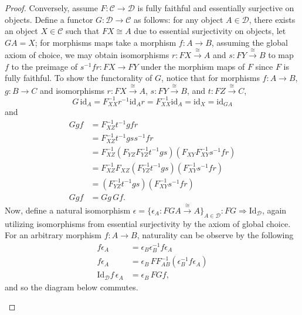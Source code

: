 \documentclass[ 12pt ]{article}
\begin{document}
\begin{enumerate}
\begin{enumerate}
\begin{proof}
				Conversely, assume $F : \mathscr{C} \to \mathscr{D}$ is fully faithful and essentially surjective on objects. Define a functor $G : \mathscr{D} \to \mathscr{C}$ as follows: for any object $A \in \mathscr{D}$, there exists an object $X \in \mathscr{C}$ such that $FX \cong A$ due to essential surjectivity on objects, let $GA = X$; for morphisms maps take a morphism $f : A \to B$, assuming the global axiom of choice, we may obtain isomorphisms $r : FX \xrightarrow{\cong} A$ and $s : FY \xrightarrow{\cong} B$ to map $f$ to the preimage of $s^{-1} f r : FX \to FY$ under the morphism maps of $F$ since $F$ is fully faithful. To show the functorality of $G$, notice that for morphisms $f : A \to B$, $g : B \to C$ and isomorphisms $r : FX \xrightarrow{\cong} A$, $s : FY \xrightarrow{\cong} B$, and $t : FZ \xrightarrow{\cong} C$, $$G\, \mathrm{id}_A = F_{XX}^{-1} r^{-1} \mathrm{id}_A r = F_{XX}^{-1} \mathrm{id}_{A} = \mathrm{id}_X = \mathrm{id}_{GA}$$ and
				\begin{align*}
					G gf &= F_{XZ}^{-1} t^{-1} gf r \\
					&= F_{XZ}^{-1} t^{-1} g ss^{-1} f r \\
					&= F_{XZ}^{-1} (F_{YZ} F_{YZ}^{-1} t^{-1} g s)(F_{XY} F_{XY}^{-1} s^{-1} f r) \\
					&= F_{XZ}^{-1} F_{XZ} (F_{YZ}^{-1} t^{-1} g s)(F_{XY}^{-1} s^{-1} f r) \\
					&= (F_{YZ}^{-1} t^{-1} g s)(F_{XY}^{-1} s^{-1} f r) \\
					G gf &= Gg\, Gf.
				\end{align*}
				Now, define a natural isomorphism $\epsilon = \{ \epsilon_A : FG A \xrightarrow{\cong} A \}_{A \in \mathscr{D}} : FG \Rightarrow \mathrm{Id}_\mathscr{D}$, again utilizing isomorphisms from essential surjectivity by the axiom of global choice. For an arbitrary morphism $f : A \to B$, naturality can be observe by the following
				\begin{align*}
					f \epsilon_A &= \epsilon_B \epsilon_B^{-1} f \epsilon_A \\
					f \epsilon_A &= \epsilon_B\, F F_{AB}^{-1}( \epsilon_B^{-1} f \epsilon_A ) \\
					\mathrm{Id}_\mathscr{D} f\, \epsilon_A &= \epsilon_B\, FG f,
				\end{align*}
				and so the diagram below commutes.
				\begin{center}
\end{center}
\end{proof}
\end{enumerate}
\end{enumerate}
\end{document}
